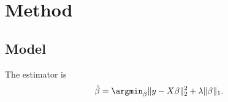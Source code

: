 \chapter{Method}
\section{Model}
\label{sec:model}
The estimator is
\begin{equation}
  \hat{\beta} = \argmin_{\beta} \|y - X\beta\|_2^2 + \lambda \|\beta\|_1 .
\end{equation}
